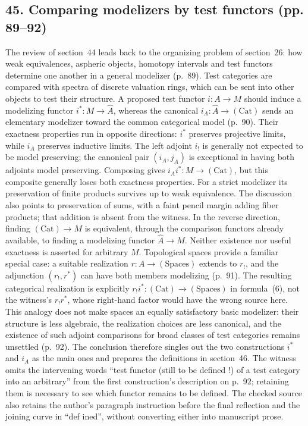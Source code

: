 \documentclass[10pt,oneside]{book}
\begin{document}
\subsection*{45. Comparing modelizers by test functors (pp. 89--92)}
The review of section~44 leads back to the organizing problem of section~26: how weak equivalences, aspheric objects, homotopy intervals and test functors determine one another in a general modelizer (p.~89). Test categories are compared with spectra of discrete valuation rings, which can be sent into other objects to test their structure. A proposed test functor $i:A\to M$ should induce a modelizing functor $i^*:M\to\widehat A$, whereas the canonical $i_A:\widehat A\to(\mathrm{Cat})$ sends an elementary modelizer toward the common categorical model (p.~90). Their exactness properties run in opposite directions: $i^*$ preserves projective limits, while $i_A$ preserves inductive limits. The left adjoint $i_!$ is generally not expected to be model preserving; the canonical pair $(i_A,j_A)$ is exceptional in having both adjoints model preserving. Composing gives $i_Ai^*:M\to(\mathrm{Cat})$, but this composite generally loses both exactness properties. For a strict modelizer its preservation of finite products survives up to weak equivalence. The discussion also points to preservation of sums, with a faint pencil margin adding fiber products; that addition is absent from the witness. In the reverse direction, finding $(\mathrm{Cat})\to M$ is equivalent, through the comparison functors already available, to finding a modelizing functor $\widehat A\to M$. Neither existence nor useful exactness is asserted for arbitrary $M$. Topological spaces provide a familiar special case: a suitable realization $r:A\to(\mathrm{Spaces})$ extends to $r_!$, and the adjunction $(r_!,r^*)$ can have both members modelizing (p.~91). The resulting categorical realization is explicitly $r_!i^*:(\mathrm{Cat})\to(\mathrm{Spaces})$ in formula~(6), not the witness's $r_!r^*$, whose right-hand factor would have the wrong source here. This analogy does not make spaces an equally satisfactory basic modelizer: their structure is less algebraic, the realization choices are less canonical, and the existence of such adjoint comparisons for broad classes of test categories remains unsettled (p.~92). The conclusion therefore singles out the two constructions $i^*$ and $i_A$ as the main ones and prepares the definitions in section~46. The witness omits the intervening words ``test functor (still to be defined !) of a test category into an arbitrary'' from the first construction's description on p.~92; retaining them is necessary to see which functor remains to be defined. The checked source also retains the author's paragraph instruction before the final reflection and the joining curve in ``def ined'', without converting either into manuscript prose.
\end{document}
